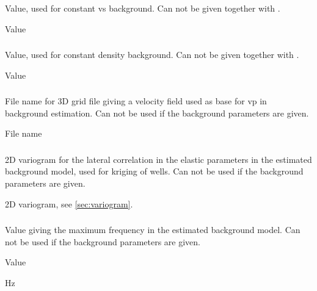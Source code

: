 \subsubsection{}
 \slist
   \item \Description Value, used for constant vs background. Can not be given together with .
   \item \Argument Value
   \item \Default
 \elist

\subsubsection{}
 \slist
   \item \Description Value, used for constant density background. Can not be given together with .
   \item \Argument Value
   \item \Default
 \elist

\subsubsection{}
 \slist
   \item \Description File name for 3D grid file giving a velocity field used as base for vp in background estimation. Can not be used if the background parameters are given.
   \item \Argument File name
   \item \Default
 \elist

\subsubsection{}
 \slist
   \item \Description 2D variogram for the lateral correlation in the elastic parameters in the estimated background model, used for kriging of wells. Can not be used if the background parameters are given.
   \item \Argument 2D variogram, see \autoref{sec:variogram}.
   \item \Default
 \elist

\subsubsection{}
 \slist
   \item \Description Value giving the maximum frequency in the estimated background model. Can not be used if the background parameters are given.
   \item \Argument Value
   \item {} Hz
 \elist
 
